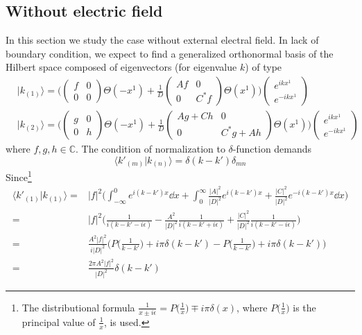 \subsection{Without electric field}\label{sect-nbnef}
In this section we study the case without external electral field.
In lack of boundary condition, we expect to find a generalized orthonormal basis of the Hilbert space composed of eigenvectors (for eigenvalue $k$) of type
\begin{equation}
\begin{split}
& | k_{(1)} \rangle = \bigg( \begin{pmatrix} f & 0 \\ 0 & 0 \end{pmatrix}
\Theta(-x^1) + 
\frac{1}{D}\begin{pmatrix} Af & 0 \\  0 & C^* f \end{pmatrix} \Theta(x^1) \bigg)
\begin{pmatrix} e^{ikx^1}  \\ e^{-ikx^1} \end{pmatrix}   \\
& | k_{(2)} \rangle = \bigg( \begin{pmatrix} g& 0 \\ 0 & h \end{pmatrix}
\Theta(-x^1) + 
\frac{1}{D}\begin{pmatrix} Ag + Ch  & 0\\ 0&  C^*g + Ah  \end{pmatrix} \Theta(x^1) \bigg)
\begin{pmatrix} e^{ikx^1}  \\  e^{-ikx^1}  \end{pmatrix}  
\end{split}
\end{equation}
where $f,g,h \in \mathbb{C}$.
The condition of normalization to $\delta$-function demands
\begin{equation}
\langle k'_{(m)} | k_{(n)} \rangle = \delta(k - k') \delta_{mn}
\end{equation}
Since\footnote{
The distributional formula $\frac{1}{x \pm i\epsilon} = P\big(\frac{1}{x}\big) \mp i\pi\delta(x)$, where $P\big(\frac{1}{x}\big)$ is the principal value of $\frac{1}{x}$, is used.}
\begin{equation}
\begin{split}
\langle k'_{(1)} | k_{(1)} \rangle = & |f|^2 \bigg( \int_{-\infty}^0 e^{i(k - k')x} \dd x + \int_0^{\infty}\frac{|A|^2}{|D|^2} e^{i(k-k')x} + \frac{|C|^2}{|D|^2} e^{-i(k - k')x} \dd x \bigg) \\
= & |f|^2 \bigg( \frac{1}{i(k-k' - i\epsilon)} - \frac{A^2}{|D|^2}\frac{1}{i(k-k'+i\epsilon)} + \frac{|C|^2}{|D|^2}\frac{1}{i(k-k'-i\epsilon)} \bigg) \\
= & \frac{A^2 |f|^2}{i |D|^2}\Big( P\big(\frac{1}{k-k'}\big) + i\pi \delta(k-k') - P\big(\frac{1}{k-k'}\big) + i\pi \delta(k-k') \Big) \\
= & \frac{2\pi A^2 |f|^2}{|D|^2} \delta(k-k')
\end{split}
\end{equation}
